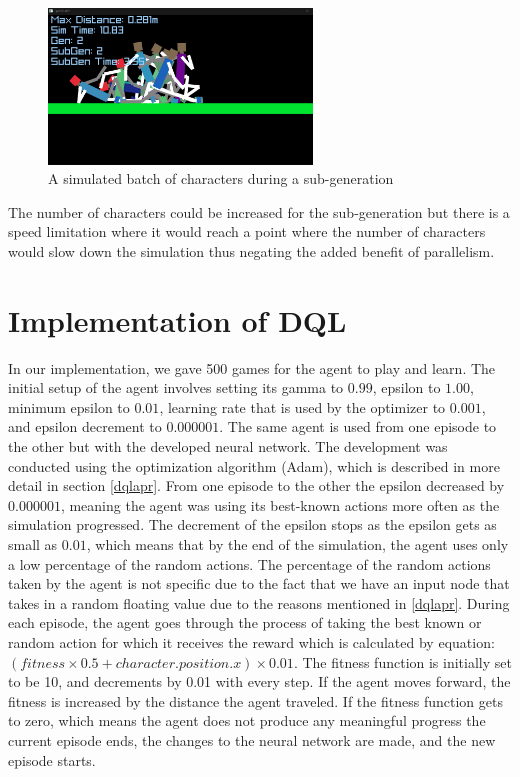 \documentclass[letterpaper]{article} %
\begin{document}
\begin{figure}[h]
\caption{A simulated batch of characters during a sub-generation}
\centering
\includegraphics[width=7cm]{many.png}
\end{figure}

\par The number of characters could be increased for the sub-generation but there is a speed limitation where it would reach a point where the number of characters would slow down the simulation thus negating the added benefit of parallelism.

\section{Implementation of DQL}

In our implementation, we gave 500 games for the agent to play and learn. The initial setup of the agent involves setting its gamma to $0.99$, epsilon to $1.00$, minimum epsilon to $0.01$, learning rate that is used by the optimizer to $0.001$, and epsilon decrement to $0.000001$. The same agent is used from one episode to the other but with the developed neural network. The development was conducted using the optimization algorithm (Adam), which is described in more detail in section \ref{dqlapr}. From one episode to the other the epsilon decreased by $0.000001$, meaning the agent was using its best-known actions more often as the simulation progressed. The decrement of the epsilon stops as the epsilon gets as small as $0.01$, which means that by the end of the simulation, the agent uses only a low percentage of the random actions. The percentage of the random actions taken by the agent is not specific due to the fact that we have an input node that takes in a random floating value due to the reasons mentioned in \ref{dqlapr}. During each episode, the agent goes through the process of taking the best known or random action for which it receives the reward which is calculated by equation: $(fitness \times 0.5 + character.position.x) \times 0.01 $. The fitness function is initially set to be 10, and decrements by 0.01 with every step. If the agent moves forward, the fitness is increased by the distance the agent traveled. If the fitness function gets to zero, which means the agent does not produce any meaningful progress the current episode ends, the changes to the neural network are made, and the new episode starts.
\end{document}
